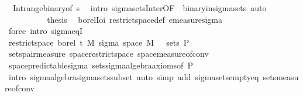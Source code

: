 \begin{isabellebody}
\ {\isacharasterisk}{\kern0pt}\ Int{\isacharunderscore}{\kern0pt}range{\isacharunderscore}{\kern0pt}binary{\isacharbrackleft}{\kern0pt}of\ {\isachardoublequoteopen}{\isacharbraceleft}{\kern0pt}s{\isacharless}{\kern0pt}{\isachardot}{\kern0pt}{\isachardot}{\kern0pt}{\isacharbraceright}{\kern0pt}{\isachardoublequoteclose}{\isacharbrackright}{\kern0pt}\ \isamarkupfalse%
\ {\isacharparenleft}{\kern0pt}intro\ sigma{\isacharunderscore}{\kern0pt}sets{\isacharunderscore}{\kern0pt}Inter{\isacharbrackleft}{\kern0pt}OF\ {\isacharunderscore}{\kern0pt}\ binary{\isacharunderscore}{\kern0pt}in{\isacharunderscore}{\kern0pt}sigma{\isacharunderscore}{\kern0pt}sets{\isacharbrackright}{\kern0pt}{\isacharparenright}{\kern0pt}\ auto\ \ \ \ \ \ \ \ \isanewline
\ \ \ \ \isamarkupfalse%
\isanewline
\ \ \ \ \isamarkupfalse%
\ {\isacharquery}{\kern0pt}thesis\ \isamarkupfalse%
\ borel{\isacharunderscore}{\kern0pt}Ioi\ restrict{\isacharunderscore}{\kern0pt}space{\isacharunderscore}{\kern0pt}def\ emeasure{\isacharunderscore}{\kern0pt}sigma\ \isamarkupfalse%
\ {\isacharparenleft}{\kern0pt}force\ intro{\isacharcolon}{\kern0pt}\ sigma{\isacharunderscore}{\kern0pt}eqI{\isacharparenright}{\kern0pt}\ \ \ \ \ \isanewline
\ \ \isamarkupfalse%
\isanewline
\ \ \isamarkupfalse%
\ \isamarkupfalse%
\ {\isachardoublequoteopen}restrict{\isacharunderscore}{\kern0pt}space\ borel\ {\isacharbraceleft}{\kern0pt}t\ {\isasymOtimes}\isactrlsub M\ sigma\ {\isacharparenleft}{\kern0pt}space\ M{\isacharparenright}{\kern0pt}\ {\isacharbraceleft}{\kern0pt}{\isacharbraceright}{\kern0pt}\ {\isasymsubseteq}\ sets\ {\isasymSigma}\isactrlsub P{\isachardoublequoteclose}\ \isanewline
\ \ \ \ \isamarkupfalse%
\ sets{\isacharunderscore}{\kern0pt}pair{\isacharunderscore}{\kern0pt}measure\ space{\isacharunderscore}{\kern0pt}restrict{\isacharunderscore}{\kern0pt}space\ space{\isacharunderscore}{\kern0pt}measure{\isacharunderscore}{\kern0pt}of{\isacharunderscore}{\kern0pt}conv\isanewline
\ \ \ \ \isamarkupfalse%
\ space{\isacharunderscore}{\kern0pt}predictable{\isacharunderscore}{\kern0pt}sigma\ sets{\isachardot}{\kern0pt}sigma{\isacharunderscore}{\kern0pt}algebra{\isacharunderscore}{\kern0pt}axioms{\isacharbrackleft}{\kern0pt}of\ {\isasymSigma}\isactrlsub P{\isacharbrackright}{\kern0pt}\ \isanewline
\ \ \ \ \isamarkupfalse%
\ {\isacharparenleft}{\kern0pt}intro\ sigma{\isacharunderscore}{\kern0pt}algebra{\isachardot}{\kern0pt}sigma{\isacharunderscore}{\kern0pt}sets{\isacharunderscore}{\kern0pt}subset{\isacharparenright}{\kern0pt}\ {\isacharparenleft}{\kern0pt}auto\ simp\ add{\isacharcolon}{\kern0pt}\ sigma{\isacharunderscore}{\kern0pt}sets{\isacharunderscore}{\kern0pt}empty{\isacharunderscore}{\kern0pt}eq\ sets{\isacharunderscore}{\kern0pt}measure{\isacharunderscore}{\kern0pt}of{\isacharunderscore}{\kern0pt}conv{\isacharparenright}{\kern0pt}\isanewline

\end{isabellebody}
